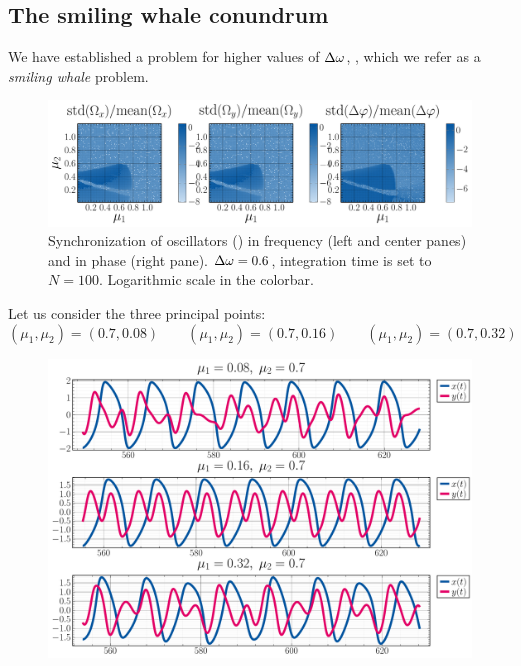 \documentclass{mynotes}
\begin{document}
\subsection{ The smiling whale conundrum }

We have established a problem for higher values of \( \Delta\omega \), , which we refer as a \emph{smiling whale} problem. 

\begin{figure}[hbtp]
      \centering
      \includegraphics[width = 1.0\columnwidth]{figures/06.png}
      \caption{
            Synchronization of oscillators () in frequency (left and center panes) and in phase (right pane). \( \Delta\omega = 0.6 \), integration time is set to \( N = 100 \). {\color{rwth-red}Logarithmic scale in the colorbar.}
            \label{fig:dw06}
      }
\end{figure}

Let us consider the three principal points:
\begin{equation}
      \left( \mu_1, \mu_2 \right) = \left( 0.7, 0.08 \right) \qquad \left( \mu_1, \mu_2 \right) = \left( 0.7, 0.16 \right) \qquad \left( \mu_1, \mu_2 \right) = \left( 0.7, 0.32 \right)
\end{equation}

\begin{figure}[hbtp]
      \centering
      \includegraphics[width = 1.0\columnwidth]{figures/examples_trio.pdf} 
\end{figure}
\end{document}
